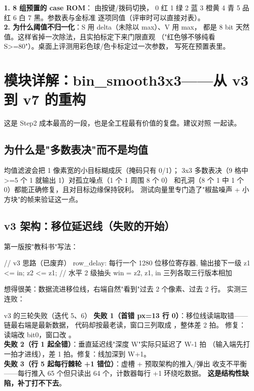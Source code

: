 \textbf{1. 8 组预置的 case ROM}： 由按键/拨码切换，
0 红 1 绿 2 蓝 3 橙黄 4 青 5 品红 6 白 7 黑。参数表与金标准
 逐项同值（评审时可以直接对表）。\\
\textbf{2. 为什么阈值不归一化}：S 用 delta（未除以 max）、V 用 max，
都是 8 bit 天然值。这样省掉一次除法，且实拍标定下来门限直观
（"红色够不够纯看 S>=80"）。桌面上评测用彩色球/色卡标定过一次参数，
写死在预置表里。

\section{模块详解：bin\_smooth3x3——从 v3 到 v7 的重构}

这是 Step2 成本最高的一段，也是全工程最有价值的复盘。建议对照
 一起读。

\subsection{为什么是"多数表决"而不是均值}

均值滤波会把 1 像素宽的小目标糊成灰（掩码只有 0/1）；
3x3 多数表决（9 格中 >=5 个 1 就输出 1）对孤立噪点（1 个 1 周围 8 个 0）
和孔洞（8 个 1 中 1 个 0）都能正确修复，且对目标边缘保持锐利。
测试向量里专门造了"椒盐噪声 + 小方块"的帧来验证这一点。

\subsection{v3 架构：移位延迟线（失败的开始）}

第一版按"教科书"写法：

\begin{Verilog}
// v3 思路（已废弃）
row_delay: 每行一个 1280 位移位寄存器, 输出接下一级
z1 <= in; z2 <= z1;              // 水平 2 级抽头
win = {z2, z1, in} 三列各取三行版本相加
\end{Verilog}

想得很美：数据流进移位线，右端自然"看到"过去 2 个像素、过去 2 行。
实测三连败：

\begin{warnbox}{v3 的三轮失败（迭代 5、6）}
\textbf{失败 1（首错 px=13 行 0）}：移位线读端取错——链最右端是最新数据，
代码却按最老读，窗口三列取成 ，整体差 2 拍。
修复：读端改 bit0，窗口改 。\\
\textbf{失败 2（行 1 起全错）}：垂直延迟线"深度 W"实际只延迟了 W-1 拍
（输入端先打一拍才进线），差 1 拍。修复：线加深到 W+1。\\
\textbf{失败 3（行 5 起每行棘轮 +1 错位）}：虚槽 + 预取架构的推入/弹出
收支不平衡——每行推入 65 个但只读出 64 个，计数器每行 +1 环绕吃数据。
\textbf{这是结构性缺陷，补丁打不下去}。
\end{warnbox}

